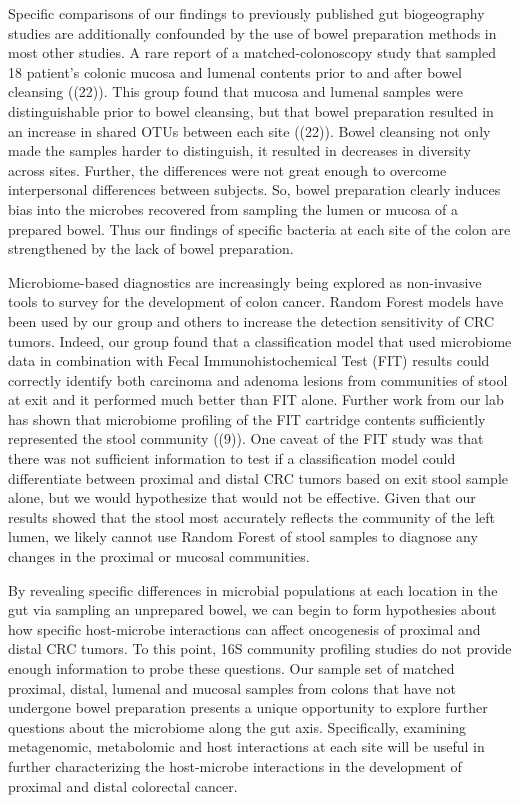 \documentclass[11pt,]{article}
\begin{document}
Specific comparisons of our findings to previously published gut
biogeography studies are additionally confounded by the use of bowel
preparation methods in most other studies. A rare report of a
matched-colonoscopy study that sampled 18 patient's colonic mucosa and
lumenal contents prior to and after bowel cleansing ((22)). This group
found that mucosa and lumenal samples were distinguishable prior to
bowel cleansing, but that bowel preparation resulted in an increase in
shared OTUs between each site ((22)). Bowel cleansing not only made the
samples harder to distinguish, it resulted in decreases in diversity
across sites. Further, the differences were not great enough to overcome
interpersonal differences between subjects. So, bowel preparation
clearly induces bias into the microbes recovered from sampling the lumen
or mucosa of a prepared bowel. Thus our findings of specific bacteria at
each site of the colon are strengthened by the lack of bowel
preparation.

Microbiome-based diagnostics are increasingly being explored as
non-invasive tools to survey for the development of colon cancer. Random
Forest models have been used by our group and others to increase the
detection sensitivity of CRC tumors. Indeed, our group found that a
classification model that used microbiome data in combination with Fecal
Immunohistochemical Test (FIT) results could correctly identify both
carcinoma and adenoma lesions from communities of stool at exit and it
performed much better than FIT alone. Further work from our lab has
shown that microbiome profiling of the FIT cartridge contents
sufficiently represented the stool community ((9)). One caveat of the
FIT study was that there was not sufficient information to test if a
classification model could differentiate between proximal and distal CRC
tumors based on exit stool sample alone, but we would hypothesize that
would not be effective. Given that our results showed that the stool
most accurately reflects the community of the left lumen, we likely
cannot use Random Forest of stool samples to diagnose any changes in the
proximal or mucosal communities.

By revealing specific differences in microbial populations at each
location in the gut via sampling an unprepared bowel, we can begin to
form hypothesies about how specific host-microbe interactions can affect
oncogenesis of proximal and distal CRC tumors. To this point, 16S
community profiling studies do not provide enough information to probe
these questions. Our sample set of matched proximal, distal, lumenal and
mucosal samples from colons that have not undergone bowel preparation
presents a unique opportunity to explore further questions about the
microbiome along the gut axis. Specifically, examining metagenomic,
metabolomic and host interactions at each site will be useful in further
characterizing the host-microbe interactions in the development of
proximal and distal colorectal cancer.
\end{document}
